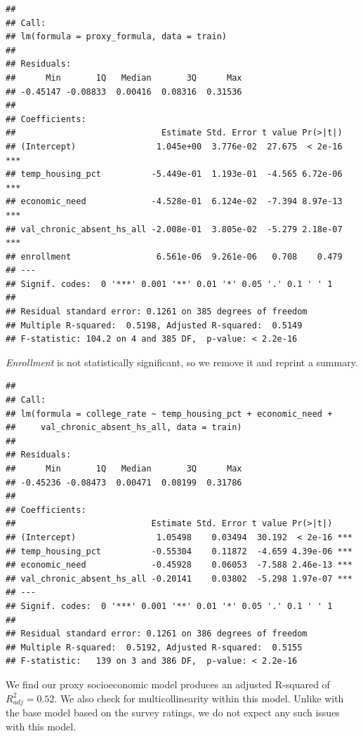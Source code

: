 \documentclass[
  man,floatsintext]{apa6}
\begin{document}
\begin{verbatim}
## 
## Call:
## lm(formula = proxy_formula, data = train)
## 
## Residuals:
##      Min       1Q   Median       3Q      Max 
## -0.45147 -0.08833  0.00416  0.08316  0.31536 
## 
## Coefficients:
##                             Estimate Std. Error t value Pr(>|t|)    
## (Intercept)                1.045e+00  3.776e-02  27.675  < 2e-16 ***
## temp_housing_pct          -5.449e-01  1.193e-01  -4.565 6.72e-06 ***
## economic_need             -4.528e-01  6.124e-02  -7.394 8.97e-13 ***
## val_chronic_absent_hs_all -2.008e-01  3.805e-02  -5.279 2.18e-07 ***
## enrollment                 6.561e-06  9.261e-06   0.708    0.479    
## ---
## Signif. codes:  0 '***' 0.001 '**' 0.01 '*' 0.05 '.' 0.1 ' ' 1
## 
## Residual standard error: 0.1261 on 385 degrees of freedom
## Multiple R-squared:  0.5198, Adjusted R-squared:  0.5149 
## F-statistic: 104.2 on 4 and 385 DF,  p-value: < 2.2e-16
\end{verbatim}

\emph{Enrollment} is not statistically significant, so we remove it and reprint a summary.

\begin{verbatim}
## 
## Call:
## lm(formula = college_rate ~ temp_housing_pct + economic_need + 
##     val_chronic_absent_hs_all, data = train)
## 
## Residuals:
##      Min       1Q   Median       3Q      Max 
## -0.45236 -0.08473  0.00471  0.08199  0.31786 
## 
## Coefficients:
##                           Estimate Std. Error t value Pr(>|t|)    
## (Intercept)                1.05498    0.03494  30.192  < 2e-16 ***
## temp_housing_pct          -0.55304    0.11872  -4.659 4.39e-06 ***
## economic_need             -0.45928    0.06053  -7.588 2.46e-13 ***
## val_chronic_absent_hs_all -0.20141    0.03802  -5.298 1.97e-07 ***
## ---
## Signif. codes:  0 '***' 0.001 '**' 0.01 '*' 0.05 '.' 0.1 ' ' 1
## 
## Residual standard error: 0.1261 on 386 degrees of freedom
## Multiple R-squared:  0.5192, Adjusted R-squared:  0.5155 
## F-statistic:   139 on 3 and 386 DF,  p-value: < 2.2e-16
\end{verbatim}

We find our proxy socioeconomic model produces an adjusted R-squared of \(R^2_{adj} = 0.52\). We also check for multicollinearity within this model. Unlike with the base model based on the survey ratings, we do not expect any such issues with this model.
\end{document}
